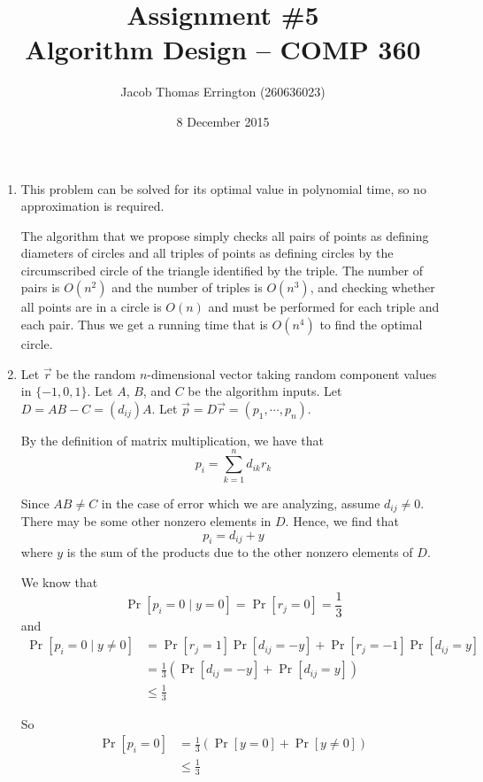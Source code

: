 \documentclass[letterpaper,11pt]{article}
\author{Jacob Thomas Errington (260636023)}
\title{Assignment \#5\\Algorithm Design -- COMP 360}
\date{8 December 2015}
\begin{document}
\begin{enumerate}
    \item
        This problem can be solved for its optimal value in polynomial time, so
        no approximation is required.

        The algorithm that we propose simply checks all pairs of points as
        defining diameters of circles and all triples of points as defining
        circles by the circumscribed circle of the triangle identified by the
        triple. The number of pairs is $O(n^2)$ and the number of triples is
        $O(n^3)$, and checking whether all points are in a circle is $O(n)$ and
        must be performed for each triple and each pair. Thus we get a running
        time that is $O(n^4)$ to find the optimal circle.

    \item
        Let $\vec r$ be the random $n$-dimensional vector taking random
        component values in $\{-1, 0, 1\}$. Let $A$, $B$, and $C$ be the
        algorithm inputs. Let $D = AB - C = (d_{ij})A$. Let
        $\vec p = D \vec r = (p_1, \cdots, p_n)$.

        By the definition of matrix multiplication, we have that
        $$p_i = \sum_{k=1}^n {d_{ik}r_k}$$

        Since $AB \neq C$ in the case of error which we are analyzing, assume
        $d_{ij} \neq 0$. There may be some other nonzero elements in $D$.
        Hence, we find that
        $$p_i = d_{ij} + y$$
        where $y$ is the sum of the products due to the other nonzero elements
        of $D$.

        We know that
        $$\Pr{[p_i = 0\mid y = 0] = \Pr{[r_j = 0]} = \frac{1}{3}}$$
        and
        \begin{align*}
            \Pr{[p_i = 0\mid y \neq 0]}
                &= \Pr{[r_j = 1]}\Pr{[d_{ij} = -y]}
                + \Pr{[r_j = -1]}\Pr{[d_{ij} = y]} \\
                &= \frac{1}{3}
                \left(\Pr{[d_{ij} = -y]} + \Pr{[d_{ij} = y]}\right) \\
                &\leq \frac{1}{3}
        \end{align*}

        So
        \begin{align*}
            \Pr{[p_i = 0]}
                &= \frac{1}{3}\left(\Pr{[y = 0]} + \Pr{[y \neq 0]}\right) \\
                &\leq \frac{1}{3}
        \end{align*}


\end{enumerate}
\end{document}
